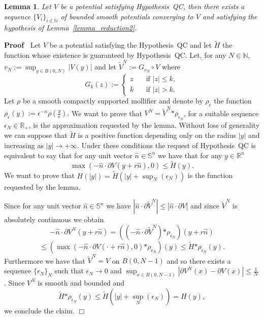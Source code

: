 \documentclass[a4paper,10pt]{article}
\newcommand{\assign}{:=}
\newcommand{\asterisk}{\mathord{*}}
\newenvironment{proof}{\noindent\textbf{Proof\ }}{\hspace*{\fill}$\Box$\medskip}
\newtheorem{lemma}{Lemma}
\begin{document}
\begin{lemma}
  \label{lemma_reduction3}Let $V$ be a potential satisfying Hypothesis~QC,
  then there exists a sequence $\{ V_i \}_{i \in \mathbb{N}}$ of bounded
  smooth potentials converging to $V$ and satisfying the hypothesis of
  Lemma~\ref{lemma_reduction2}. 
\end{lemma}

\begin{proof}
  Let $V$ be a potential satisfying the Hypothesis~QC and let $\tilde{H}$ the
  function whose existence is guaranteed by Hypothesis~QC. Let, for any $N \in
  \mathbb{N}$, $v_N \assign \sup_{y \in B (0, N)} | V (y) |$ and let
  $\tilde{V}^N \assign G_{v_N} \circ V$ where
  \[ G_k (z) \assign \left\{\begin{array}{ll}
       z \quad & \text{if $| z | \leqslant k$},\\
       k & \text{if $| z | > k$} .
     \end{array}\right. \]
  Let $\rho$ be a smooth compactly supported mollifier and denote by
  $\rho_{\epsilon}$ the function $\rho_{\epsilon} (y) \assign \epsilon^{- n}
  \rho \left( \frac{y}{\epsilon} \right) .$ We want to prove that $V^N =
  \tilde{V}^N \asterisk \rho_{\epsilon_N}$, for a suitable sequence
  $\epsilon_N \in \mathbb{R}_+$, is the approximation requested by the lemma.
  Without loss of generality we can suppose that $\tilde{H}$ is a positive
  function depending only on the radius $| y |$ and increasing as $| y |
  \rightarrow + \infty$. Under these conditions the request of Hypothesis~QC
  is equivalent to say that for any unit vector $\hat{n} \in \mathbb{S}^n$ we
  have that for any $y \in \mathbb{R}^n$
  \[ \max (- \hat{n} \cdot \partial V (y + r \hat{n}), 0) \leqslant \tilde{H}
     (y) . \]
  We want to prove that $H (| y |) = \tilde{H} (| y | + \sup_N (\epsilon_N))$
  is the function requested by the lemma.
  
  Since for any unit vector $\hat{n} \in \mathbb{S}^n$ we have $| \hat{n}
  \cdot \partial \tilde{V}^N | \leqslant | \hat{n} \cdot \partial V|$ and
  since $\tilde{V}^N$ is absolutely continuous we obtain
  \[ - \hat{n} \cdot \partial V^N (y + r \hat{n}) = ((- \hat{n} \cdot \partial
     \tilde{V}^N) \asterisk \rho_{\epsilon_N}) (y + r \hat{n}) \]
  \[ \leqslant (\max (- \hat{n} \cdot \partial V (\cdot + r \hat{n}), 0)
     \asterisk \rho_{\epsilon_N}) (y) \leqslant \tilde{H} \asterisk
     \rho_{\epsilon_N} (y) . \]
  Furthermore we have that $\tilde{V}^N = V$ on $B (0, N - 1)$ and so there
  exists a sequence $\{ \epsilon_N \}_N$ such that $\epsilon_N \rightarrow 0$
  and $\sup_{x \in B (0, N - 1)} | \partial V^N (x) - \partial V (x) |
  \leqslant \frac{1}{N}$. Since $V^N$ is smooth and bounded and
  \[ \tilde{H} \asterisk \rho_{\epsilon_N} (y) \leqslant \tilde{H} (| y | +
     \sup_N (\epsilon_N)) = H (y), \]
  we conclude the claim.
\end{proof}
\end{document}
